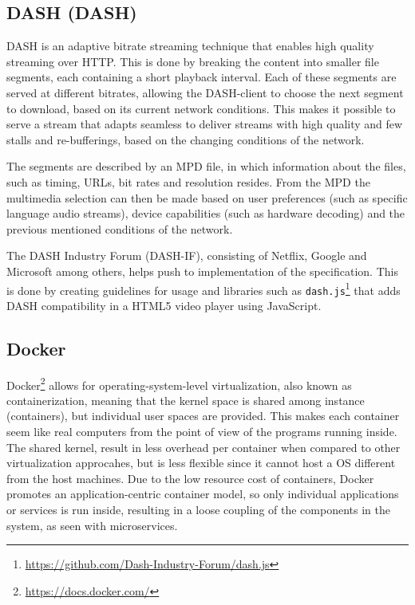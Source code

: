\subsection{\acl{DASH} (\acs{DASH})}
\ac{DASH} is an adaptive bitrate streaming technique that enables high quality streaming over \acs{HTTP}. This is done by breaking the content into smaller file segments, each containing a short playback interval. Each of these segments are served at different bitrates, allowing the \acs{DASH}-client to choose the next segment to download, based on its current network conditions.
This makes it possible to serve a stream that adapts seamless to deliver streams with high quality and few stalls and re-bufferings, based on the changing conditions of the network.

The segments are described by an \ac{MPD} file, in which information about the files, such as timing, \acs{URL}s, bit rates and resolution resides. From the \acs{MPD} the multimedia selection can then be made based on user preferences (such as specific language audio streams), device capabilities (such as hardware decoding) and the previous mentioned conditions of the network.

The \acs{DASH} Industry Forum (DASH-IF), consisting of Netflix, Google and Microsoft among others, helps push to implementation of the specification\cite{ISO23009}. This is done by creating guidelines for usage and libraries such as \texttt{dash.js}\footnote{\url{https://github.com/Dash-Industry-Forum/dash.js}} that adds \acs{DASH} compatibility in a HTML5 video player using JavaScript.

\subsection{Docker}
Docker\footnote{\url{https://docs.docker.com/}} allows for operating-system-level virtualization, also known as containerization, meaning that the kernel space is shared among instance (containers), but individual user spaces are provided. This makes each container seem like real computers from the point of view of the programs running inside. 
The shared kernel, result in less overhead per container when compared to other virtualization approcahes, but is less flexible since it cannot host a \acs{OS} different from the host machines. Due to the low resource cost of containers, Docker promotes an application-centric container model\cite{merkel2014docker}, so only individual applications or services is run inside, resulting in a loose coupling of the components in the system, as seen with microservices. 

